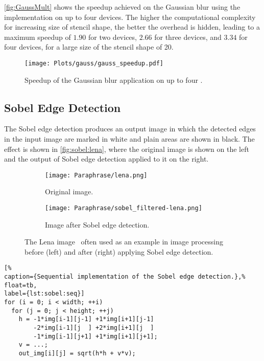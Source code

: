 \autoref{fig:GaussMult} shows the speedup achieved on the Gaussian blur using the  implementation on up to four devices.
The higher the computational complexity for increasing size of stencil shape, the better the overhead is hidden, leading to a maximum speedup of $1.90$ for two devices, $2.66$ for three devices, and $3.34$ for four devices, for a large size of the stencil shape of 20.
\begin{figure}
	\centering
	\texttt{[image: Plots/gauss/gauss\_speedup.pdf]}
	\caption{Speedup of the Gaussian blur application on up to four \GPUs.}
	\label{fig:GaussMult}
\end{figure} 










\subsection{Sobel Edge Detection}
\label{sec:sobel}
The Sobel edge detection produces an output image in which the detected edges in the input image are marked in white and plain areas are shown in black.
The effect is shown in \autoref{fig:sobel:lena}, where the original image is shown on the left and the output of Sobel edge detection applied to it on the right.

\begin{figure}[tb]
  \centering
  \begin{subfigure}[t]{.45\textwidth}
    \texttt{[image: Paraphrase/lena.png]}
    \caption{Original image.}
    \label{fig:lena:orig}
  \end{subfigure}
  \hfill
  \begin{subfigure}[t]{.45\textwidth}
    \texttt{[image: Paraphrase/sobel\_filtered-lena.png]}
    \caption{Image after Sobel edge detection.}
    \label{fig:lena:sobel}
  \end{subfigure}
  \caption[The Lena image before and after applying Sobel edge detection.]%
          {The Lena image~\cite{Lena} often used as an example in image processing before (left) and after (right) applying Sobel edge detection.}
  \label{fig:sobel:lena}
\end{figure}

\begin{lstlisting}[%
caption={Sequential implementation of the Sobel edge detection.},%
float=tb,
label={lst:sobel:seq}]
for (i = 0; i < width; ++i)
  for (j = 0; j < height; ++j)
    h = -1*img[i-1][j-1] +1*img[i+1][j-1]
        -2*img[i-1][j  ] +2*img[i+1][j  ]
        -1*img[i-1][j+1] +1*img[i+1][j+1];
    v = ...;
    out_img[i][j] = sqrt(h*h + v*v);
\end{lstlisting}
\bigskip

